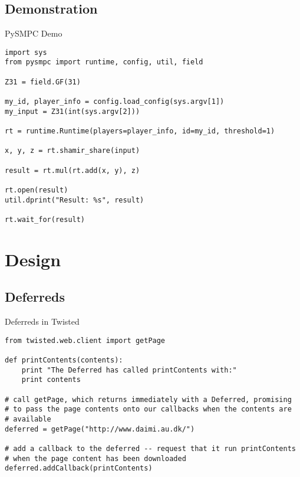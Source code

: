 \documentclass[t,noamsthm]{beamer}
\begin{document}
\subsection{Demonstration}

\begin{frame}[fragile]{PySMPC Demo}

\begin{lstlisting}
import sys
from pysmpc import runtime, config, util, field

Z31 = field.GF(31)

my_id, player_info = config.load_config(sys.argv[1])
my_input = Z31(int(sys.argv[2]))

rt = runtime.Runtime(players=player_info, id=my_id, threshold=1)

x, y, z = rt.shamir_share(input)

result = rt.mul(rt.add(x, y), z)

rt.open(result)
util.dprint("Result: %s", result)

rt.wait_for(result)
\end{lstlisting}

\end{frame}



\section{Design}

\subsection{Deferreds}

\begin{frame}[fragile]{Deferreds in Twisted}%

\begin{lstlisting}
from twisted.web.client import getPage

def printContents(contents):
    print "The Deferred has called printContents with:"
    print contents

# call getPage, which returns immediately with a Deferred, promising
# to pass the page contents onto our callbacks when the contents are
# available
deferred = getPage("http://www.daimi.au.dk/")

# add a callback to the deferred -- request that it run printContents
# when the page content has been downloaded
deferred.addCallback(printContents)
\end{lstlisting}

\end{frame}
\end{document}
